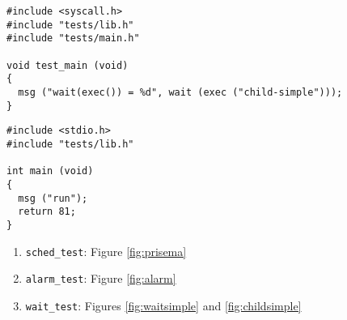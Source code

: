 \documentclass[pldi]{../sigplanconf-pldi15}
\begin{document}
\begin{figure*}
\begin{verbatim}
#include <syscall.h>
#include "tests/lib.h"
#include "tests/main.h"

void test_main (void) 
{
  msg ("wait(exec()) = %d", wait (exec ("child-simple")));
}
\end{verbatim}
	\caption{{\tt wait\_test},
	a test of {\tt exec} and of {\tt wait}/{\tt exit} interaction.}
	\label{fig:waitsimple}
\end{figure*}
\begin{figure*}
\begin{verbatim}
#include <stdio.h>
#include "tests/lib.h"

int main (void) 
{
  msg ("run");
  return 81; 
}
\end{verbatim}
	\caption{{\tt child\_simple}, a helper program used by {\tt wait\_test} (Figure~\ref{fig:waitsimple}).}
	\label{fig:childsimple}
\end{figure*}

\begin{enumerate}
	\item {\tt sched\_test}: Figure \ref{fig:prisema}
	\item {\tt alarm\_test}: Figure \ref{fig:alarm}
	\item {\tt wait\_test}: Figures \ref{fig:waitsimple} and \ref{fig:childsimple}
\end{enumerate}





{}
\end{document}
